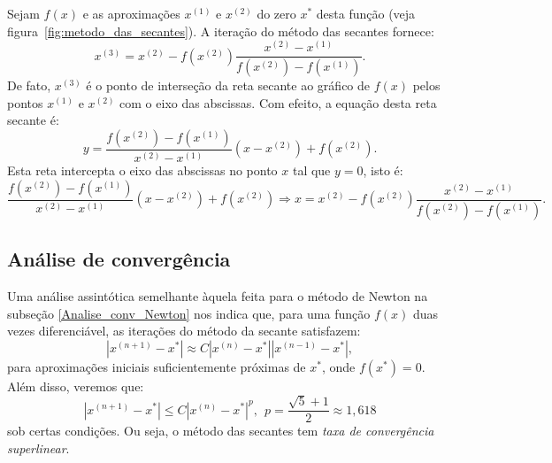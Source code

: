 Sejam $f(x)$ e as aproximações $x^{(1)}$ e $x^{(2)}$ do zero $x^*$ desta função (veja figura~\ref{fig:metodo_das_secantes}). A iteração do método das secantes fornece:
\begin{equation*}
  x^{(3)} = x^{(2)} - f(x^{(2)})\frac{x^{(2)} - x^{(1)}}{f(x^{(2)}) - f(x^{(1)})}.
\end{equation*}
De fato, $x^{(3)}$ é o ponto de interseção da reta secante ao gráfico de $f(x)$ pelos pontos $x^{(1)}$ e $x^{(2)}$ com o eixo das abscissas. Com efeito, a equação desta reta secante é:
\begin{equation*}
  y = \frac{f(x^{(2)}) - f(x^{(1)})}{x^{(2)} - x^{(1)}}(x - x^{(2)}) + f(x^{(2)}).
\end{equation*}
Esta reta intercepta o eixo das abscissas no ponto $x$ tal que $y=0$, isto é:
\begin{equation*}
  \frac{f(x^{(2)}) - f(x^{(1)})}{x^{(2)} - x^{(1)}}(x - x^{(2)}) + f(x^{(2)}) \Rightarrow x = x^{(2)} - f(x^{(2)})\frac{x^{(2)} - x^{(1)}}{f(x^{(2)}) - f(x^{(1)})}.
\end{equation*}


\subsection{Análise de convergência}

Uma análise assintótica semelhante àquela feita para o método de Newton na subseção \ref{Analise_conv_Newton} nos indica que, para uma função $f(x)$ duas vezes diferenciável, as iterações do método da secante satisfazem:
\begin{equation*}
  |x^{(n+1)} - x^*| \approx C |x^{(n)} - x^*||x^{(n-1)} - x^*|,
\end{equation*}
para aproximações iniciais suficientemente próximas de $x^*$, onde $f(x^*) = 0$. Além disso, veremos que:
\begin{equation*}
  |x^{(n+1)} - x^*| \leq C |x^{(n)} - x^*|^{p},~~ p=\frac{\sqrt{5}+1}{2}\approx 1,618
\end{equation*}
sob certas condições. Ou seja, o método das secantes tem \emph{taxa de convergência superlinear}.

